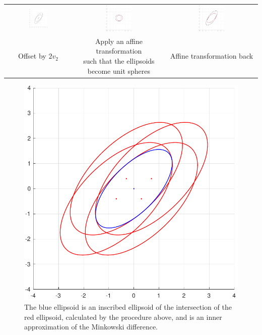 \documentclass{article}
\begin{document}
\begin{table}[h!]
\begin{tabular}{ccc}
		\includegraphics[width=0.3\textwidth]{intersect_offset_ia/6.pdf} & \includegraphics[width=0.3\textwidth]{intersect_offset_ia/7.pdf} & \includegraphics[width=0.3\textwidth]{intersect_offset_ia/8.pdf}\\
		Offset by $2v_2$ & \makecell{Apply an affine transformation \\such that the ellipsoids \\become unit spheres} & Affine transformation back
	\end{tabular}
	\label{intersect_offset_ia2}
\end{table}


\begin{figure}[H]
	\centering
	\includegraphics[width=0.3\linewidth]{intersect_offset_ia/9.pdf}
	\caption{The blue ellipsoid is an inscribed ellipsoid of the intersection of the red ellipsoid, calculated by the procedure above, and is an inner approximation of the Minkowski difference.}
	\label{intersect_offset_ia3}
\end{figure}
\end{document}

